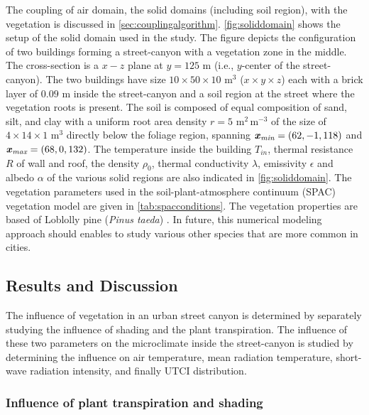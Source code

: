 The coupling of air domain, the solid domains (including soil region), with the vegetation is discussed in \cref{sec:couplingalgorithm}. \cref{fig:soliddomain} shows the setup of the solid domain used in the study. The figure depicts the configuration of two buildings forming a street-canyon with a vegetation zone in the middle. The cross-section is a $x-z$ plane at $y=125$ m  (i.e., $y$-center of the street-canyon). The two buildings have size $10 \times 50 \times 10$ m$^3$ ($x\times y \times z$) each with a brick layer of $0.09$ m inside the street-canyon and a soil region at the street where the vegetation roots is present. The soil is composed of equal composition of sand, silt, and clay with a uniform root area density $r = 5$ m$^{2}$\,m$^{-3}$ of the size of $4 \times 14 \times 1$ m$^{3}$ directly below the foliage region, spanning $\textbf{\textit{x}}_{\textit{min}} = (62, -1, 118)$ and $\textbf{\textit{x}}_{\textit{max}} = (68, 0, 132)$. The temperature inside the building $T_{\textit{in}}$, thermal resistance $R$ of wall and roof, the density $\rho_0$, thermal conductivity $\lambda$, emissivity $\epsilon$ and albedo $\alpha$ of the various solid regions are also indicated in \cref{fig:soliddomain}. The vegetation parameters used in the soil-plant-atmosphere continuum (SPAC) vegetation model are given in \cref{tab:spacconditions}. The vegetation properties are based of Loblolly pine (\textit{Pinus taeda}) \citep{Manoli2014,Volpe2013,Launiainen2015,Manzoni2011,Vogel2016}.  In future, this numerical modeling approach should enables to study various other species that are more common in cities.

\subsection{Results and Discussion}

The influence of vegetation in an urban street canyon is determined by separately studying the influence of shading and the plant transpiration. The influence of these two parameters on the microclimate inside the street-canyon is studied by determining the influence on air temperature, mean radiation temperature, short-wave radiation intensity, and finally UTCI distribution. 

\subsubsection*{Influence of plant transpiration and shading}

